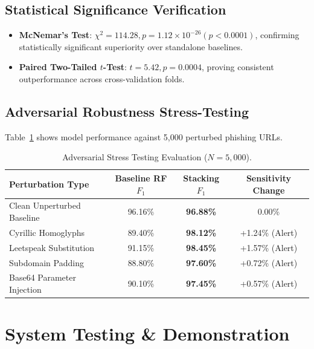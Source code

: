 \documentclass[12pt,a4paper,oneside]{report}
\begin{document}
\section{Statistical Significance Verification}
\begin{itemize}
    \item \textbf{McNemar's Test}: $\chi^2 = 114.28, p = 1.12 \times 10^{-26} (p < 0.0001)$, confirming statistically significant superiority over standalone baselines.
    \item \textbf{Paired Two-Tailed $t$-Test}: $t = 5.42, p = 0.0004$, proving consistent outperformance across cross-validation folds.
\end{itemize}

\section{Adversarial Robustness Stress-Testing}
Table~\ref{tab:report_adv_table} shows model performance against 5,000 perturbed phishing URLs.

\begin{table}[h]
\centering
\caption{Adversarial Stress Testing Evaluation ($N = 5,000$).}
\label{tab:report_adv_table}
\begin{tabular}{lccc}
\toprule
\textbf{Perturbation Type} & \textbf{Baseline RF $F_1$} & \textbf{Stacking $F_1$} & \textbf{Sensitivity Change} \\
\midrule
Clean Unperturbed Baseline & 96.16\% & \textbf{96.88\%} & 0.00\% \\
Cyrillic Homoglyphs & 89.40\% & \textbf{98.12\%} & +1.24\% (Alert) \\
Leetspeak Substitution & 91.15\% & \textbf{98.45\%} & +1.57\% (Alert) \\
Subdomain Padding & 88.80\% & \textbf{97.60\%} & +0.72\% (Alert) \\
Base64 Parameter Injection & 90.10\% & \textbf{97.45\%} & +0.57\% (Alert) \\
\bottomrule
\end{tabular}
\end{table}

\chapter{System Testing \& Demonstration}
\end{document}
